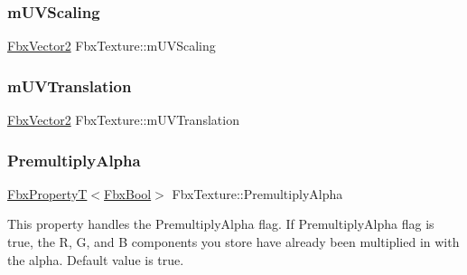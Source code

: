 \mbox{\label{class_fbx_texture_a44b35867b77a61b184302c508b2249a5}} 
\subsubsection{\texorpdfstring{m\+U\+V\+Scaling}{mUVScaling}}
{\footnotesize\ttfamily \hyperlink{class_fbx_vector2}{Fbx\+Vector2} Fbx\+Texture\+::m\+U\+V\+Scaling\hspace{0.3cm}{\ttfamily [protected]}}

\mbox{\label{class_fbx_texture_a7465889be9ff81770ca74471bd86f94d}} 
\subsubsection{\texorpdfstring{m\+U\+V\+Translation}{mUVTranslation}}
{\footnotesize\ttfamily \hyperlink{class_fbx_vector2}{Fbx\+Vector2} Fbx\+Texture\+::m\+U\+V\+Translation\hspace{0.3cm}{\ttfamily [protected]}}

\mbox{\label{class_fbx_texture_a1acbc324c1df7d407aaccf0b3f151d29}} 
\subsubsection{\texorpdfstring{Premultiply\+Alpha}{PremultiplyAlpha}}
{\footnotesize\ttfamily \hyperlink{class_fbx_property_t}{Fbx\+PropertyT}$<$\hyperlink{fbxtypes_8h_a92e0562b2fe33e76a242f498b362262e}{Fbx\+Bool}$>$ Fbx\+Texture\+::\+Premultiply\+Alpha}

This property handles the Premultiply\+Alpha flag. If Premultiply\+Alpha flag is true, the R, G, and B components you store have already been multiplied in with the alpha. Default value is true. \mbox{\label{class_fbx_texture_a299b7759e086a905185a2dabe8a5b510}} 
